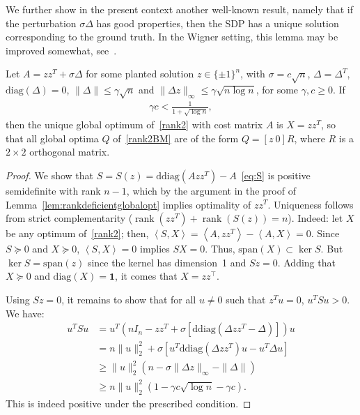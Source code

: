 \documentclass{colt2016} %
\newcommand{\transpose}{^\top\! }
\newcommand{\inner}[2]{\left\langle{#1},{#2}\right\rangle}
\newcommand{\spann}{\mathrm{span}}
\newcommand{\diag}{\mathrm{diag}}
\newcommand{\rank}{\operatorname{rank}}
\newcommand{\1}{\mathbf{1}}
\newcommand{\ddiag}{\mathrm{ddiag}}
\begin{document}
We further show in the present context another well-known result, namely that if the perturbation $\sigma \Delta$ has good properties, then the SDP has a unique solution corresponding to the ground truth. In the Wigner setting, this lemma may be improved somewhat, see~\citep[\S2.1]{bandeira2014tightness}.
\begin{lemma}\label{lem:uniqueglobaloptexact}
	Let $A = zz^T + \sigma \Delta$ for some planted solution $z \in \{\pm 1\}^n$, with $\sigma = c\sqrt{n}$, $\Delta = \Delta^T$, $\diag(\Delta) = 0$, $\|\Delta\| \leq \gamma \sqrt{n}$ and $\|\Delta z\|_\infty \leq \gamma \sqrt{n \log n}$, for some $\gamma, c \geq 0$. If
	\begin{align*}
		\gamma c < \frac{1}{1+\sqrt{\log n}},
	\end{align*}
	then the unique global optimum of~\eqref{rank2} with cost matrix $A$ is $X = zz^T$, so that all global optima $Q$ of~\eqref{rank2BM} are of the form $Q = [z \ 0]R$, where $R$ is a $2\times 2$ orthogonal matrix.
\end{lemma}
\begin{proof}
	We show that $S = S(z) = \ddiag(Azz^T) - A$~\eqref{eq:S} is positive semidefinite with rank $n-1$, which by the argument in the proof of Lemma~\ref{lem:rankdeficientglobalopt} implies optimality of $zz^T$. Uniqueness follows from strict complementarity ($\rank(zz^T) + \rank(S(z)) = n$).
	Indeed: let $X$ be any optimum of~\eqref{rank2}; then, $\inner{S}{X} = \inner{A}{zz^T} - \inner{A}{X} = 0$. Since $S \succeq 0$ and $X \succeq 0$, $\inner{S}{X} = 0$ implies $S X = 0$. Thus, $\spann(X) \subset \ker S$. But $\ker S = \spann(z)$ since the kernel has dimension~1 and $Sz = 0$. Adding that $X \succeq 0$ and $\diag(X)=\1$, it comes that $X = zz\transpose$.
	
	Using $Sz = 0$, it remains to show that for all $u \neq 0$ such that $z^Tu = 0$, $u^TSu > 0$. We have:
	\begin{align*}
		u^TSu & = u^T\left( nI_n - zz^T + \sigma \left[ \ddiag(\Delta zz^T - \Delta) \right] \right)u \\
			& = n\|u\|_2^2 + \sigma \left[ u^T\ddiag(\Delta zz^T)u - u^T\Delta u \right] \\
			& \geq \|u\|_2^2 \left( n - \sigma \|\Delta z\|_\infty - \|\Delta \| \right) \\
			& \geq n \|u\|_2^2 \left( 1 - \gamma c \sqrt{\log n} - \gamma c  \right).
	\end{align*}
	This is indeed positive under the prescribed condition.
\end{proof}
\end{document}
